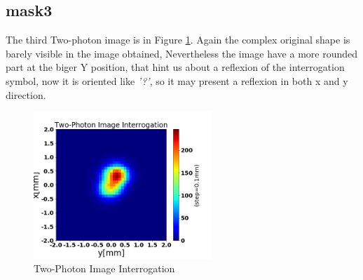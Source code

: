 \subsection{mask3}
The third Two-photon image is in Figure \ref{fig:twoPhotonInte}. Again the complex original
shape is barely visible in the image obtained, Nevertheless the image have a more rounded
part at the biger Y position, that hint us about a reflexion of the interrogation symbol,
now it is oriented like \textit{'?'}, so it may present a reflexion in both x and y direction. 
\begin{figure}[h!]
\centering
\includegraphics[width=0.6\textwidth]{Figures/twoPhotonInte.png} 
\caption{Two-Photon Image Interrogation}
\label{fig:twoPhotonInte}
\end{figure}


